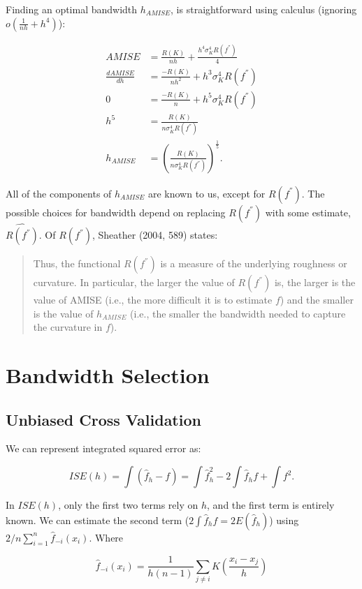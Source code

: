 \documentclass[]{article}
\begin{document}
Finding an optimal bandwidth \(h_{AMISE}\), is straightforward using
calculus (ignoring \(o\left(\frac{1}{nh} + h^4\right)\)):

\[
\begin{aligned}
AMISE &= \frac{R(K)}{nh} + \frac{h^4\sigma_K^4R(f^{''})}{4}\\
\frac{dAMISE}{dh} &= \frac{-R(K)}{nh^2} + h^3\sigma_K^4 R(f^{''})\\
0 &= \frac{-R(K)}{n} + h^5 \sigma_K^4 R(f^{''}) \\
h^5 &= \frac{R(K)}{n\sigma_K^4 R(f^{''})} \\
h_{AMISE} &= \left(\frac{R(K)}{n\sigma_K^4R(f^{''})}\right)^{\frac{1}{5}}.
\end{aligned}
\]

All of the components of \(h_{AMISE}\) are known to us, except for
\(R(f^{''})\). The possible choices for bandwidth depend on replacing
\(R(f^{''})\) with some estimate, \(\widehat{R(f^{''})}\). Of
\(R(f^{''})\), Sheather (2004, 589) states:

\begin{quote}
Thus, the functional \(R(f^{''})\) is a measure of the underlying
roughness or curvature. In particular, the larger the value of
\(R(f^{''})\) is, the larger is the value of AMISE (i.e., the more
difficult it is to estimate \(f\)) and the smaller is the value of
\(h_{AMISE}\) (i.e., the smaller the bandwidth needed to capture the
curvature in \(f\)).
\end{quote}

\section{Bandwidth Selection}\label{bandwidth-selection}

\subsection{Unbiased Cross Validation}\label{unbiased-cross-validation}

We can represent integrated squared error as:

\[
ISE(h) = \int \left(\hat{f}_h - f\right) = \int\hat{f}_h^2 - 2\int \hat{f}_hf + \int f^2.
\]

In \(ISE(h)\), only the first two terms rely on \(h\), and the first
term is entirely known. We can estimate the second term
(\(2\int \hat{f}_hf = 2 E(\hat{f}_h)\)) using
\(2/n \sum_{i=1}^{n}\hat{f}_{-i}(x_i)\). Where

\[
\hat{f}_{-i}(x_i) = \frac{1}{h(n-1)}\sum_{j \neq i} K\left(\frac{x_i - x_j}{h}\right)
\]
\end{document}

